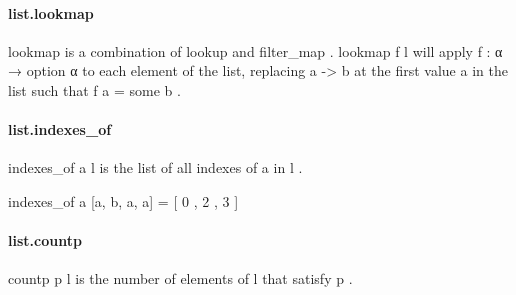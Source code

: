 \documentclass{article}
\begin{document}
\paragraph{list.lookmap}
\par
\colorbox[RGB]{253,246,227}{{{{\color[RGB]{101, 123, 131} lookmap }}}} is a combination of 
\colorbox[RGB]{253,246,227}{{{{\color[RGB]{101, 123, 131} lookup }}}} and 
\colorbox[RGB]{253,246,227}{{{{\color[RGB]{101, 123, 131} filter\_map }}}}.
\colorbox[RGB]{253,246,227}{{{{\color[RGB]{101, 123, 131} lookmap f l }}}} will apply 
\colorbox[RGB]{253,246,227}{{{{\color[RGB]{101, 123, 131} f : α  }}}{{{\color[RGB]{133, 153, 0} → }}}{{{\color[RGB]{101, 123, 131}  option α }}}} to each element of the list,
replacing 
\colorbox[RGB]{253,246,227}{{{{\color[RGB]{101, 123, 131} a  }}}{{{\color[RGB]{181, 137, 0} -> }}}{{{\color[RGB]{101, 123, 131}  b }}}} at the first value 
\colorbox[RGB]{253,246,227}{{{{\color[RGB]{101, 123, 131} a }}}} in the list such that 
\colorbox[RGB]{253,246,227}{{{{\color[RGB]{101, 123, 131} f a  }}}{{{\color[RGB]{181, 137, 0} = }}}{{{\color[RGB]{101, 123, 131}  some b }}}}.
\paragraph{list.indexes\_of}
\par
\colorbox[RGB]{253,246,227}{{{{\color[RGB]{101, 123, 131} indexes\_of a l }}}} is the list of all indexes of 
\colorbox[RGB]{253,246,227}{{{{\color[RGB]{101, 123, 131} a }}}} in 
\colorbox[RGB]{253,246,227}{{{{\color[RGB]{101, 123, 131} l }}}}.
\\
\colorbox[RGB]{253,246,227}{\parbox{4.5in}{{{{\color[RGB]{101, 123, 131} indexes\_of a {[}a, b, a, a{]}  }}}{{{\color[RGB]{181, 137, 0} = }}}{{{\color[RGB]{101, 123, 131}  {[} }}}{{{\color[RGB]{108, 113, 196} 0 }}}{{{\color[RGB]{101, 123, 131} ,  }}}{{{\color[RGB]{108, 113, 196} 2 }}}{{{\color[RGB]{101, 123, 131} ,  }}}{{{\color[RGB]{108, 113, 196} 3 }}}{{{\color[RGB]{101, 123, 131} {]} }}}\\

}}\paragraph{list.countp}
\par
\colorbox[RGB]{253,246,227}{{{{\color[RGB]{101, 123, 131} countp p l }}}} is the number of elements of 
\colorbox[RGB]{253,246,227}{{{{\color[RGB]{101, 123, 131} l }}}} that satisfy 
\colorbox[RGB]{253,246,227}{{{{\color[RGB]{101, 123, 131} p }}}}.
\end{document}

